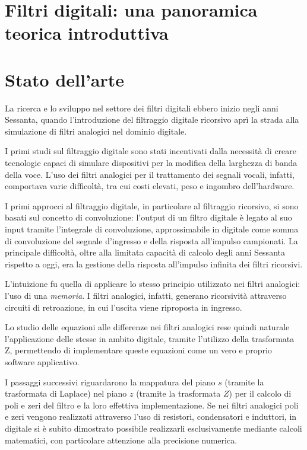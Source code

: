 \documentclass[12pt]{report}
\begin{document}
\chapter{Filtri digitali: una panoramica teorica introduttiva}
\label{cap:panoramica_introduttiva}

%
%

\chapter{Stato dell'arte}
\label{chap:stato_arte}
La ricerca e lo sviluppo nel settore dei filtri digitali ebbero inizio negli anni Sessanta, quando l’introduzione del filtraggio digitale ricorsivo aprì la strada alla simulazione di filtri analogici nel dominio digitale.

I primi studi sul filtraggio digitale sono stati incentivati dalla necessità di creare tecnologie capaci di simulare dispositivi per la modifica della larghezza di banda della voce. L'uso dei filtri analogici per il trattamento dei segnali vocali, infatti, comportava varie difficoltà, tra cui costi elevati, peso e ingombro dell'hardware.

I primi approcci al filtraggio digitale, in particolare al filtraggio ricorsivo, si sono basati sul concetto di convoluzione: l’output di un filtro digitale è legato al suo input tramite l’integrale di convoluzione, approssimabile in digitale come somma di convoluzione del segnale d’ingresso e della risposta all’impulso campionati. La principale difficoltà, oltre alla limitata capacità di calcolo degli anni Sessanta rispetto a oggi, era la gestione della risposta all'impulso infinita dei filtri ricorsivi.

L’intuizione fu quella di applicare lo stesso principio utilizzato nei filtri analogici: l’uso di una \textit{memoria}. I filtri analogici, infatti, generano ricorsività attraverso circuiti di retroazione, in cui l’uscita viene riproposta in ingresso.

Lo studio delle equazioni alle differenze nei filtri analogici rese quindi naturale l’applicazione delle stesse in ambito digitale, tramite l'utilizzo della trasformata Z, permettendo di implementare queste equazioni come un vero e proprio software applicativo.

I passaggi successivi riguardarono la mappatura del piano \( s \) (tramite la trasformata di Laplace) nel piano \( z \) (tramite la trasformata \( Z \)) per il calcolo di poli e zeri del filtro e la loro effettiva implementazione. Se nei filtri analogici poli e zeri vengono realizzati attraverso l’uso di resistori, condensatori e induttori, in digitale si è subito dimostrato possibile realizzarli esclusivamente mediante calcoli matematici, con particolare attenzione alla precisione numerica.
\end{document}
